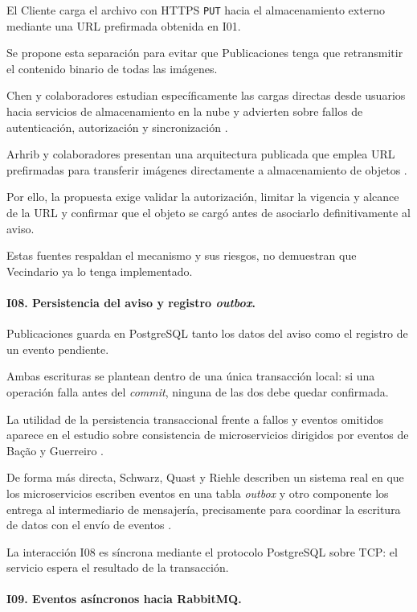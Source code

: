 \documentclass[12pt,a4paper]{article}
\begin{document}
El Cliente carga el archivo con HTTPS \texttt{PUT} hacia el almacenamiento externo mediante una URL prefirmada obtenida en I01.

Se propone esta separación para evitar que Publicaciones tenga que retransmitir el contenido binario de todas las imágenes.

Chen y colaboradores estudian específicamente las cargas directas desde usuarios hacia servicios de almacenamiento en la nube y advierten sobre fallos de autenticación, autorización y sincronización \cite{chen2025upload}.

Arhrib y colaboradores presentan una arquitectura publicada que emplea URL prefirmadas para transferir imágenes directamente a almacenamiento de objetos \cite{arhrib2026serverless}.

Por ello, la propuesta exige validar la autorización, limitar la vigencia y alcance de la URL y confirmar que el objeto se cargó antes de asociarlo definitivamente al aviso.

Estas fuentes respaldan el mecanismo y sus riesgos, no demuestran que Vecindario ya lo tenga implementado.

\paragraph{I08. Persistencia del aviso y registro \emph{outbox}.}

Publicaciones guarda en PostgreSQL tanto los datos del aviso como el registro de un evento pendiente.

Ambas escrituras se plantean dentro de una única transacción local: si una operación falla antes del \emph{commit}, ninguna de las dos debe quedar confirmada.

La utilidad de la persistencia transaccional frente a fallos y eventos omitidos aparece en el estudio sobre consistencia de microservicios dirigidos por eventos de Bação y Guerreiro \cite{bacao2026consistency}.

De forma más directa, Schwarz, Quast y Riehle describen un sistema real en que los microservicios escriben eventos en una tabla \emph{outbox} y otro componente los entrega al intermediario de mensajería, precisamente para coordinar la escritura de datos con el envío de eventos \cite{schwarz2025outbox}.

La interacción I08 es síncrona mediante el protocolo PostgreSQL sobre TCP: el servicio espera el resultado de la transacción.

\paragraph{I09. Eventos asíncronos hacia RabbitMQ.}
\end{document}

